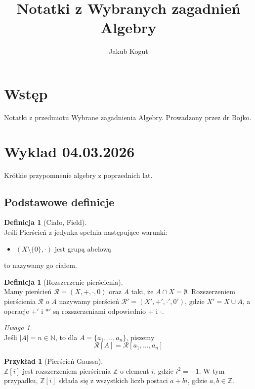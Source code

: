 \documentclass[11pt,a4paper]{article}
\title{Notatki z Wybranych zagadnień Algebry}
\author{Jakub Kogut}
\theoremstyle{definition}
\newtheorem{definicja}[twierdzenie]{Definicja}
\newtheorem{przyklad}[twierdzenie]{Przykład}
\theoremstyle{remark}
\newtheorem{uwaga}[twierdzenie]{Uwaga}
\begin{document}
\maketitle

\tableofcontents  %
\newpage

\section{Wstęp}
Notatki z przedmiotu Wybrane zagadnienia Algebry. Prowadzony przez dr Bojko.
\section{Wyklad 04.03.2026}
Krótkie przypomnenie algebry z poprzednich lat.
\subsection{Podstawowe definicje}
\begin{definicja}[Ciało, Field]~\\
    Jeśli Pierścień z jedynka spełnia następujące warunki:
    \begin{itemize}
        \item $(X\setminus \{0\}, \cdot)$ jest grupą abelową
    \end{itemize}
    to nazywamy go ciałem.
\end{definicja}
\begin{definicja}[Rozszerzenie pierścienia]~\\
    Mamy pierścień $\mathcal{R} = (X, +, \cdot, 0)$ oraz $A$ taki, że $A \cap X = \emptyset$. Rozszerzeniem pierścienia $\mathcal{R}$ o $A$ nazywamy pierścień $\mathcal{R}' = (X', +', \cdot', 0')$, gdzie $X' = X \cup A$, a operacje $+'$ i $*'$ są rozszerzeniami odpowiednio $+$ i $\cdot$.
\end{definicja}
\begin{uwaga}~\\
    Jeśli $|A| = n \in \mathbb{N}$, to dla $A= \{a_1, \dots, a_n\}$, piszemy 
    \[
        \mathcal{R} [A]=\mathcal{R}[a_1, \dots, a_n]
    \]
\end{uwaga}
\begin{przyklad}[Pierścień Gaussa]~\\
    $\mathbb{Z}[i]$ jest rozszerzeniem pierścienia $\mathbb{Z}$ o element $i$, gdzie $i^2 = -1$. W tym przypadku, $\mathbb{Z}[i]$ składa się z wszystkich liczb postaci $a + bi$, gdzie $a, b \in \mathbb{Z}$.
\end{przyklad}
\end{document}
